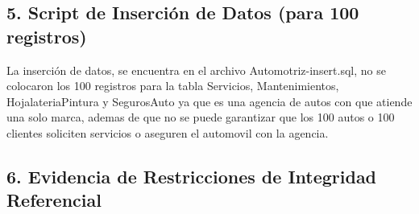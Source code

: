 \documentclass[12pt]{article}
\begin{document}
    \subsection*{5. Script de Inserción de Datos (para 100 registros)}
    La inserción de datos, se encuentra en el archivo Automotriz-insert.sql, no se colocaron los 100 registros para la tabla Servicios, Mantenimientos, HojalateriaPintura y SegurosAuto ya que es una agencia de autos con que atiende una solo marca, ademas de que no se puede garantizar que los 100 autos o 100 clientes soliciten servicios o aseguren el automovil con la agencia.
    

    \subsection*{6. Evidencia de Restricciones de Integridad Referencial}
\end{document}
